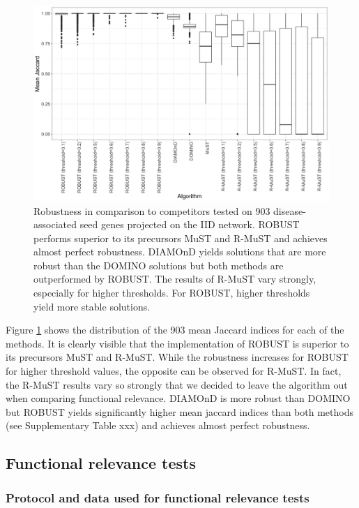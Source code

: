\documentclass{bioinfo}
\begin{document}
\begin{figure}[htb]
\centering
\includegraphics[width=0.8\linewidth]{img/all_robustness_results.png}
\caption[Robustness in comparison to competitors.]{Robustness in comparison to competitors tested on 903 disease-associated seed genes projected on the IID network. ROBUST performs superior to its precursors MuST and R-MuST and achieves almost perfect robustness. DIAMOnD yields solutions that are more robust than the DOMINO solutions but both methods are outperformed by ROBUST. The results of R-MuST vary strongly, especially for higher thresholds. For ROBUST, higher thresholds yield more stable solutions.}
\label{robustness_subset}
\end{figure}

Figure \ref{robustness_subset} shows the distribution of the 903 mean Jaccard indices for each of the methods. It is clearly visible that the implementation of ROBUST is superior to its precursors MuST and R-MuST. While the robustness increases for ROBUST for higher threshold values, the opposite can be observed for R-MuST. In fact, the R-MuST results vary so strongly that we decided to leave the algorithm out when comparing functional relevance. DIAMOnD is more robust than DOMINO but ROBUST yields significantly higher mean jaccard indices than both methods (see Supplementary Table xxx) and achieves almost perfect robustness. 

\subsection{Functional relevance tests}

\subsubsection{Protocol and data used for functional relevance tests}
\end{document}
